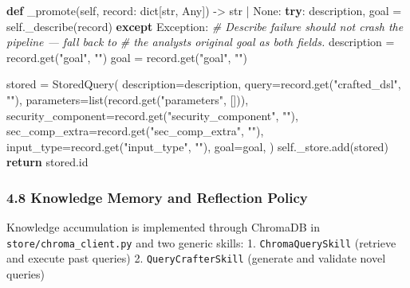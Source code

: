 \documentclass[
]{article}
\newenvironment{Shaded}{}{}
\newcommand{\BuiltInTok}[1]{\textcolor[rgb]{0.00,0.50,0.00}{#1}}
\newcommand{\CommentTok}[1]{\textcolor[rgb]{0.38,0.63,0.69}{\textit{#1}}}
\newcommand{\ControlFlowTok}[1]{\textcolor[rgb]{0.00,0.44,0.13}{\textbf{#1}}}
\newcommand{\KeywordTok}[1]{\textcolor[rgb]{0.00,0.44,0.13}{\textbf{#1}}}
\newcommand{\NormalTok}[1]{#1}
\newcommand{\OperatorTok}[1]{\textcolor[rgb]{0.40,0.40,0.40}{#1}}
\newcommand{\PreprocessorTok}[1]{\textcolor[rgb]{0.74,0.48,0.00}{#1}}
\newcommand{\StringTok}[1]{\textcolor[rgb]{0.25,0.44,0.63}{#1}}
\newcommand{\VariableTok}[1]{\textcolor[rgb]{0.10,0.09,0.49}{#1}}
\begin{document}
\begin{Shaded}
\begin{Highlighting}[]
\KeywordTok{def}\NormalTok{ \_promote(}\VariableTok{self}\NormalTok{, record: }\BuiltInTok{dict}\NormalTok{[}\BuiltInTok{str}\NormalTok{, Any]) }\OperatorTok{{-}\textgreater{}} \BuiltInTok{str} \OperatorTok{|} \VariableTok{None}\NormalTok{:}
    \ControlFlowTok{try}\NormalTok{:}
\NormalTok{        description, goal }\OperatorTok{=} \VariableTok{self}\NormalTok{.\_describe(record)}
    \ControlFlowTok{except} \PreprocessorTok{Exception}\NormalTok{:}
        \CommentTok{\# Describe failure should not crash the pipeline — fall back to}
        \CommentTok{\# the analyst\textquotesingle{}s original goal as both fields.}
\NormalTok{        description }\OperatorTok{=}\NormalTok{ record.get(}\StringTok{"goal"}\NormalTok{, }\StringTok{""}\NormalTok{)}
\NormalTok{        goal }\OperatorTok{=}\NormalTok{ record.get(}\StringTok{"goal"}\NormalTok{, }\StringTok{""}\NormalTok{)}

\NormalTok{    stored }\OperatorTok{=}\NormalTok{ StoredQuery(}
\NormalTok{        description}\OperatorTok{=}\NormalTok{description,}
\NormalTok{        query}\OperatorTok{=}\NormalTok{record.get(}\StringTok{"crafted\_dsl"}\NormalTok{, }\StringTok{""}\NormalTok{),}
\NormalTok{        parameters}\OperatorTok{=}\BuiltInTok{list}\NormalTok{(record.get(}\StringTok{"parameters"}\NormalTok{, [])),}
\NormalTok{        security\_component}\OperatorTok{=}\NormalTok{record.get(}\StringTok{"security\_component"}\NormalTok{, }\StringTok{""}\NormalTok{),}
\NormalTok{        sec\_comp\_extra}\OperatorTok{=}\NormalTok{record.get(}\StringTok{"sec\_comp\_extra"}\NormalTok{, }\StringTok{""}\NormalTok{),}
\NormalTok{        input\_type}\OperatorTok{=}\NormalTok{record.get(}\StringTok{"input\_type"}\NormalTok{, }\StringTok{""}\NormalTok{),}
\NormalTok{        goal}\OperatorTok{=}\NormalTok{goal,}
\NormalTok{    )}
    \VariableTok{self}\NormalTok{.\_store.add(stored)}
    \ControlFlowTok{return}\NormalTok{ stored.}\BuiltInTok{id}
\end{Highlighting}
\end{Shaded}

\subsubsection{4.8 Knowledge Memory and Reflection
Policy}\label{knowledge-memory-and-reflection-policy}

Knowledge accumulation is implemented through ChromaDB in
\texttt{store/chroma\_client.py} and two generic skills: 1.
\texttt{ChromaQuerySkill} (retrieve and execute past queries) 2.
\texttt{QueryCrafterSkill} (generate and validate novel queries)
\end{document}
